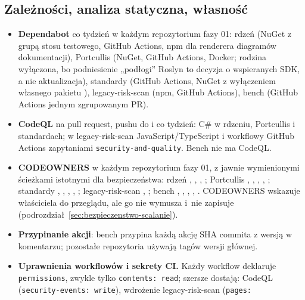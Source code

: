 \subsection{Zależności, analiza statyczna, własność}\label{sec:bezpieczenstwo-zaleznosci}

\begin{itemize}
  \item \textbf{Dependabot} co tydzień w każdym repozytorium fazy 01: rdzeń (NuGet z
        grupą stosu testowego, GitHub Actions, npm dla renderera diagramów dokumentacji),
        Portcullis (NuGet, GitHub Actions, Docker; rodzina
         wyłączona, bo podniesienie „podłogi” Roslyn to
        decyzja o wspieranych SDK, a nie aktualizacja), standardy (GitHub
        Actions, NuGet z wyłączeniem własnego pakietu ),
        legacy-risk-scan (npm, GitHub Actions), bench (GitHub Actions jednym zgrupowanym
        PR).
  \item \textbf{CodeQL} na pull request, pushu do  i co tydzień: C\# w rdzeniu,
        Portcullis i standardach; w legacy-risk-scan JavaScript/TypeScript i workflowy GitHub
        Actions zapytaniami \texttt{security-and-quality}. Bench nie ma CodeQL.
  \item \textbf{CODEOWNERS} w każdym repozytorium fazy 01, z jawnie wymienionymi ścieżkami
        istotnymi dla bezpieczeństwa: rdzeń , ,
        , ; Portcullis ,
        , , ,
        ; standardy , ,
        , , ; legacy-risk-scan
        , ; bench ,
        , , , .
        CODEOWNERS wskazuje właściciela do przeglądu, ale go nie wymusza i~nie zapisuje
        (podrozdział~\ref{sec:bezpieczenstwo-scalanie}).
  \item \textbf{Przypinanie akcji}: bench przypina każdą akcję SHA commita z wersją w
        komentarzu; pozostałe repozytoria używają tagów wersji głównej.
  \item \textbf{Uprawnienia workflowów i sekrety CI.} Każdy workflow deklaruje
        \texttt{permissions}, zwykle tylko \texttt{contents: read}; szersze dostają: CodeQL
        (\texttt{security-events: write}), wdrożenie legacy-risk-scan (\texttt{pages:
}
\end{itemize}
